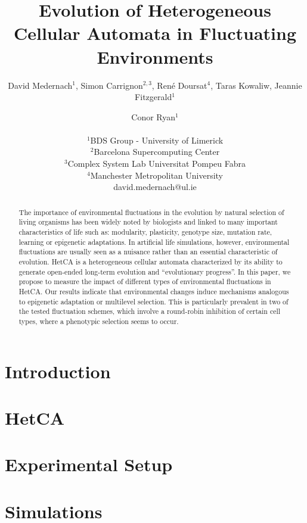 \documentclass[letterpaper]{article}
\title{Evolution of Heterogeneous Cellular Automata in Fluctuating Environments}
\author{David Medernach$^{1}$, Simon Carrignon$^{2,3}$, Ren\'{e} Doursat$^{4}$, Taras Kowaliw, Jeannie Fitzgerald$^1$ \and Conor Ryan$^1$ \\
\mbox{}\\
$^1$BDS Group - University of Limerick  \\
$^2$Barcelona Supercomputing Center \\
$^3$Complex System Lab Universitat Pompeu Fabra \\
$^4$Manchester Metropolitan University \\
david.medernach@ul.ie}
\begin{document}
\maketitle

\begin{abstract}
The importance of environmental fluctuations in the evolution by natural selection of living organisms has been widely noted by biologists and linked to many important characteristics of life such as: modularity, plasticity, genotype size, mutation rate, learning or epigenetic adaptations. In artificial life simulations, however, environmental fluctuations are usually seen as a nuisance rather than an essential characteristic of evolution. HetCA is a heterogeneous cellular automata characterized by its ability to generate open-ended long-term evolution and ``evolutionary progress''. In this paper, we propose to measure the impact of different types of environmental fluctuations in HetCA. Our results indicate that environmental changes induce mechanisms analogous to epigenetic adaptation or multilevel selection. This is particularly prevalent in two of the tested fluctuation schemes, which involve a round-robin inhibition of certain cell types, where a phenotypic selection seems to occur.
\end{abstract}

\section{Introduction}\label{sec:intro}


%

\section{HetCA}\label{sec:hetca)}


\section{Experimental Setup}\label{sec:exsetup}


\section{Simulations}\label{sec:method}

\end{document}
